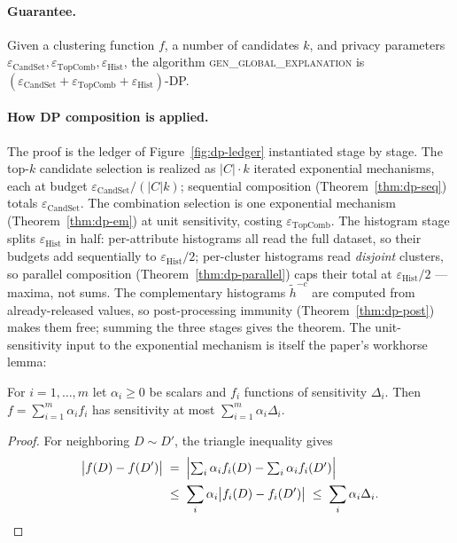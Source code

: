 \paragraph{Guarantee.}

\begin{theorem}\label{thm:dp-298-main}
Given a clustering function $f$, a number of candidates $k$, and privacy parameters
$\varepsilon_{\mathrm{CandSet}}, \varepsilon_{\mathrm{TopComb}},
\varepsilon_{\mathrm{Hist}}$, the algorithm \textsc{gen\_global\_explanation} is
$(\varepsilon_{\mathrm{CandSet}} + \varepsilon_{\mathrm{TopComb}} +
\varepsilon_{\mathrm{Hist}})$-DP. \eop
\end{theorem}

\paragraph{How DP composition is applied.}
The proof is the ledger of Figure~\ref{fig:dp-ledger} instantiated stage by stage. The
top-$k$ candidate selection is realized as $|C| \cdot k$ iterated exponential
mechanisms, each at budget $\varepsilon_{\mathrm{CandSet}}/(|C| k)$; sequential
composition (Theorem~\ref{thm:dp-seq}) totals $\varepsilon_{\mathrm{CandSet}}$. The
combination selection is one exponential mechanism (Theorem~\ref{thm:dp-em}) at unit
sensitivity, costing $\varepsilon_{\mathrm{TopComb}}$. The histogram stage splits
$\varepsilon_{\mathrm{Hist}}$ in half: per-attribute histograms all read the full
dataset, so their budgets add sequentially to $\varepsilon_{\mathrm{Hist}}/2$;
per-cluster histograms read \emph{disjoint} clusters, so parallel composition
(Theorem~\ref{thm:dp-parallel}) caps their total at $\varepsilon_{\mathrm{Hist}}/2$ ---
maxima, not sums. The complementary histograms $\tilde h^{-c}$ are computed from
already-released values, so post-processing immunity (Theorem~\ref{thm:dp-post}) makes
them free; summing the three stages gives the theorem. The unit-sensitivity input to
the exponential mechanism is itself the paper's workhorse lemma:

\begin{lemma}\label{lem:dp-298-convex}
For $i = 1,\dots,m$ let $\alpha_i \ge 0$ be scalars and $f_i$ functions of sensitivity
$\Delta_i$. Then $f = \sum_{i=1}^m \alpha_i f_i$ has sensitivity at most
$\sum_{i=1}^m \alpha_i \Delta_i$. \eop
\end{lemma}

\begin{proof}
For neighboring $D \sim D'$, the triangle inequality gives
\begin{align*}
\bigl|f(D) - f(D')\bigr|
\;&=\;\Bigl|\textstyle\sum_i \alpha_i f_i(D) - \sum_i \alpha_i f_i(D')\Bigr|\\
\;&\le\; \sum_i \alpha_i \bigl|f_i(D) - f_i(D')\bigr|
\;\le\; \sum_i \alpha_i \Delta_i.
\end{align*}
\end{proof}

